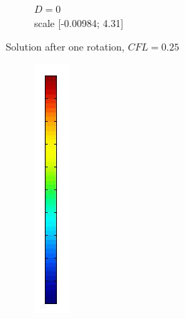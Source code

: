 \documentclass[mathserif]{beamer}
\begin{document}
\begin{frame}
\begin{figure}[H]
\begin{subfigure}[H]{0.3\textwidth}
		\vspace{-3mm}
		\caption{$D = 0$\\\vspace{-2mm}scale [-0.00984; 4.31]}
	\end{subfigure}
	\vspace{-3mm}
	\caption{Solution after one rotation, $CFL = 0.25$}	
\end{figure}
\vspace{-8mm}
\begin{figure}[H]
\centering
	\begin{subfigure}[H]{0.02\textwidth}
		\includegraphics[width=\textwidth]{images/timedep-multiscale/stability/scale.jpg}

\end{subfigure}
\end{figure}
\end{frame}
\end{document}
